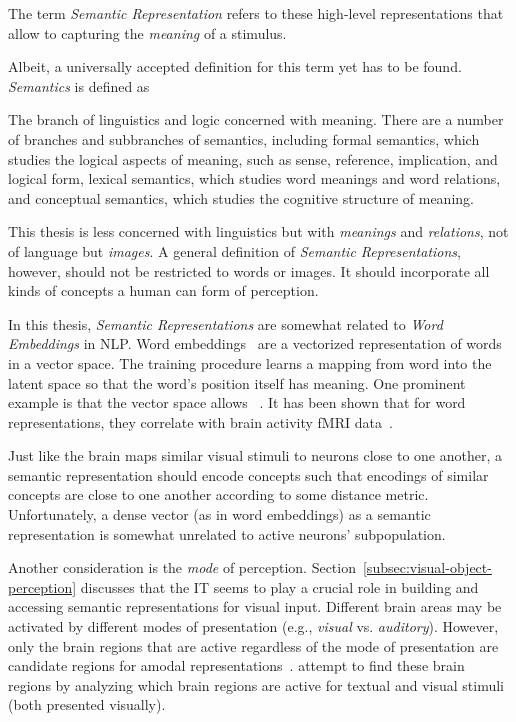The term \textit{Semantic Representation} refers to these high-level representations that allow to capturing the \textit{meaning} of a stimulus.

Albeit, a universally accepted definition for this term yet has to be found.
\textit{Semantics} is defined as~\citep{lexico}
\begin{displayquote}
    The branch of linguistics and logic concerned with meaning. There are a number of branches and subbranches of semantics, including formal semantics, which studies the logical aspects of meaning, such as sense, reference, implication, and logical form, lexical semantics, which studies word meanings and word relations, and conceptual semantics, which studies the cognitive structure of meaning.
\end{displayquote}
This thesis is less concerned with linguistics but with \textit{meanings} and \textit{relations}, not of language but \textit{images}.
A general definition of \textit{Semantic Representations}, however, should not be restricted to words or images.
It should incorporate all kinds of concepts a human can form of perception.

In this thesis, \textit{Semantic Representations} are somewhat related to \textit{Word Embeddings} in \ac{NLP}.
Word embeddings~\citep{mikolov2013efficient} are a vectorized representation of words in a vector space.
The training procedure learns a mapping from word into the latent space so that the word's position itself has meaning.
One prominent example is that the vector space allows ~\citep{mikolov2013efficient}.
It has been shown that for word representations, they correlate with brain activity fMRI data~\citep{ruan2016exploring, anderson2013words}.

Just like the brain maps similar visual stimuli to neurons close to one another, a semantic representation should encode concepts such that encodings of similar concepts are close to one another according to some distance metric.
Unfortunately, a dense vector (as in word embeddings) as a semantic representation is somewhat unrelated to active neurons’ subpopulation.

Another consideration is the \textit{mode} of perception.
Section~\ref{subsec:visual-object-perception} discusses that the \ac{IT} seems to play a crucial role in building and accessing semantic representations for visual input.
Different brain areas may be activated by different modes of presentation (e.g., \textit{visual} vs. \textit{auditory}).
However, only the brain regions that are active regardless of the mode of presentation are candidate regions for amodal representations~\citep{fairhall2013brain}.
\citet{fairhall2013brain} attempt to find these brain regions by analyzing which brain regions are active for textual and visual stimuli (both presented visually).

